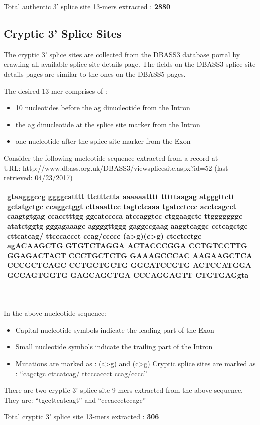 \documentclass[12pt,a4paper]{article}
\begin{document}
	Total authentic 3’ splice site 13-mers extracted : \textbf{2880}
	\subsection{Cryptic 3' Splice Sites}
	The cryptic 3’ splice sites are collected from the DBASS3 database portal \cite{dbass-0,dbass-1,dbass-2} by crawling all available splice site details page. The fields on the DBASS3 splice site details pages are similar to the ones on the DBASS5 pages. \par 
	The desired 13-mer comprises of : 
	\begin{itemize}
		\item 10 nucleotides before the ag dinucleotide from the Intron
		\item the ag dinucleotide at the splice site marker from the Intron
		\item one nucleotide after the splice site marker from the Exon
	\end{itemize}
	Consider the following nucleotide sequence extracted from a record at \\ URL: http://www.dbass.org.uk/DBASS3/viewsplicesite.aspx?id=52 (last retrieved: 04/23/2017)\par
	\vspace{5mm}	
	\begin{tabular}{ | p{\linewidth} |}
		\hline
		gtaagggccg ggggcatttt ttctttctta aaaaaatttt tttttaagag atgggttctt gctatgctgc ccaggctggt cttaaattcc tagtctcaaa tgatcctccc acctcagcct caagtgtgag ccacctttgg ggcatcccca atccaggtcc ctggaagctc ttgggggggc atatctggtg gggagaaagc aggggttggg gaggccgaag aaggtcaggc cctcagctgc cttcatca\textbf{g/ t}tcccaccct cca\textbf{g/c}cccc \textbf{(a>g)}\textbf{(c>g)} ctcctcctgc agACAAGCTG GTGTCTAGGA ACTACCCGGA CCTGTCCTTG GGAGACTACT CCCTGCTCTG GAAAGCCCAC AAGAAGCTCA CCCGCTCAGC CCTGCTGCTG GGCATCCGTG ACTCCATGGA GCCAGTGGTG GAGCAGCTGA CCCAGGAGTT CTGTGAGgta \\
		\hline
	\end{tabular}
	\\
	\\
	In the above nucleotide sequence:
	\begin{itemize}
	\item Capital nucleotide symbols indicate the leading part of the Exon
	\item Small nucleotide symbols indicate the trailing part of the Intron
	\item Mutations are marked as : (a>g) and (c>g)
	Cryptic splice sites are marked as : “cagctgc cttcatcag/ ttcccaccct ccag/cccc”
	\end{itemize}
	There are two cryptic 3’ splice site 9-mers extracted from the above sequence. They are: “tgccttcatcagt” and “cccaccctccagc” \par
	Total cryptic 3’ splice site 13-mers extracted : \textbf{306}
\end{document}
